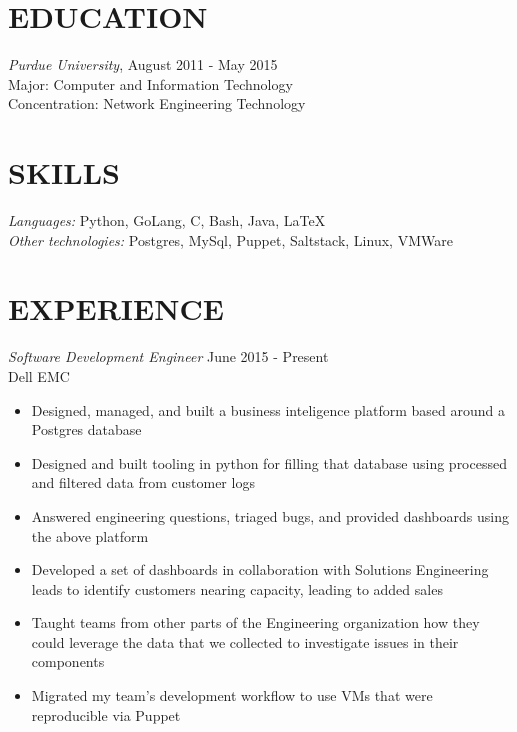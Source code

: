 \documentclass[line,margin]{res}
\begin{document}
  \name{\textcolor{TealBlue}{Ethan Madden}}
  \address{ethan@madden.ninja - (812) 250-1419}
  \address{2049 NW 60th St, Seattle WA 98107}

\begin{resume}
  \section{\textcolor{TealBlue}{EDUCATION}} 
    {\sl Purdue University}, \hfill August 2011 - May 2015 \\
      Major: Computer and Information Technology \\
      Concentration: Network Engineering Technology

  \section{\textcolor{TealBlue}{SKILLS}} 
    {\sl Languages:}  Python, GoLang, C, Bash, Java, \LaTeX \\
    {\sl Other technologies:} Postgres, MySql, Puppet, Saltstack, Linux, VMWare

  \section{\textcolor{TealBlue}{EXPERIENCE}} 
    {\sl Software Development Engineer} \hfill June 2015 - Present \\
      Dell EMC
      \begin{itemize}  \itemsep -2pt
          \item Designed, managed, and built a business inteligence platform based around a Postgres database
          \item Designed and built tooling in python for filling that database using processed and filtered data from customer logs
          \item Answered engineering questions, triaged bugs, and provided dashboards using the above platform
          \item Developed a set of dashboards in collaboration with Solutions Engineering leads to identify customers nearing capacity, leading to added sales
          \item Taught teams from other parts of the Engineering organization how they could leverage the data that we collected to investigate issues in their components
          \item Migrated my team's development workflow to use VMs that were reproducible via Puppet
      \end{itemize}


\end{resume}
\end{document}

